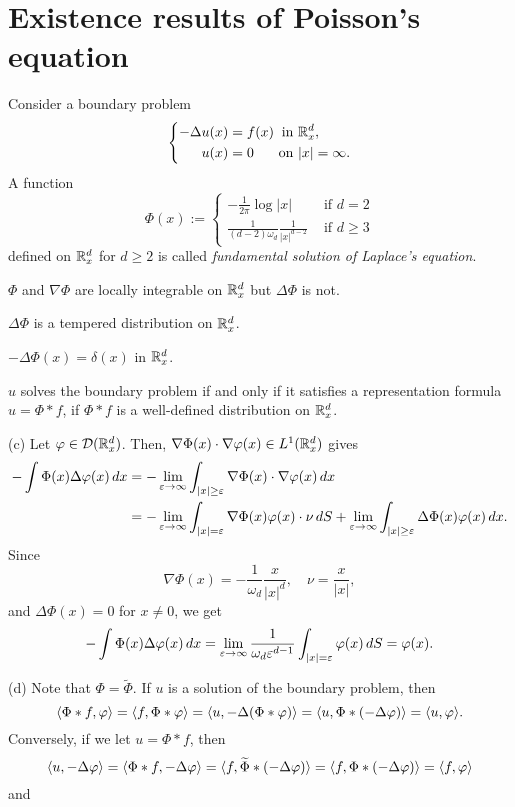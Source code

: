 \documentclass{../note}
\begin{document}
\section{Existence results of Poisson's equation}
\begin{prb}
Consider a boundary problem
\[\left\{\begin{alignedat}{2}
-\Delta u(x)&=f(x) & \text{ in }&\mathbb{R}_x^d,\\
u(x)&=0 & \text{ on }&|x|=\infty.
\end{alignedat}\right.\]
A function
\[\Phi(x):=\begin{cases}-\frac1{2\pi}\log|x|&\text{ if }d=2\\\frac1{(d-2)\omega_d}\frac1{|x|^{d-2}}&\text{ if }d\ge3\end{cases}\]
defined on $\mathbb{R}_x^d$ for $d\ge2$ is called \emph{fundamental solution of Laplace's equation}.
\begin{parts}
\item $\Phi$ and $\nabla\Phi$ are locally integrable on $\mathbb{R}_x^d$ but $\Delta\Phi$ is not.
\item $\Delta\Phi$ is a tempered distribution on $\mathbb{R}_x^d$.
\item $-\Delta\Phi(x)=\delta(x)$ in $\mathbb{R}_x^d$.
\item $u$ solves the boundary problem if and only if it satisfies a representation formula $u=\Phi*f$, if $\Phi*f$ is a well-defined distribution on $\mathbb{R}_x^d$.
\end{parts}
\end{prb}
\begin{pf}
(c)
Let $\varphi\in\mathcal{D}(\mathbb{R}_x^d)$.
Then, $\nabla\Phi(x)\cdot\nabla\varphi(x)\in L^1(\mathbb{R}_x^d)$ gives
\begin{align*}
-\int\Phi(x)\Delta\varphi(x)\,dx
&=-\lim_{\varepsilon\to\infty}\int_{|x|\ge\varepsilon}\nabla\Phi(x)\cdot\nabla\varphi(x)\,dx\\
&=-\lim_{\varepsilon\to\infty}\int_{|x|=\varepsilon}\nabla\Phi(x)\varphi(x)\cdot\nu\,dS
+\lim_{\varepsilon\to\infty}\int_{|x|\ge\varepsilon}\Delta\Phi(x)\varphi(x)\,dx.
\end{align*}
Since
\[\nabla\Phi(x)=-\frac1{\omega_d}\frac x{|x|^d},\quad\nu=\frac x{|x|},\]
and $\Delta\Phi(x)=0$ for $x\ne0$, we get
\[-\int\Phi(x)\Delta\varphi(x)\,dx=\lim_{\varepsilon\to\infty}\frac1{\omega_d\varepsilon^{d-1}}\int_{|x|=\varepsilon}\varphi(x)\,dS=\varphi(x).\]

(d)
Note that $\Phi=\tilde\Phi$.
If $u$ is a solution of the boundary problem, then
\[\langle\Phi*f,\varphi\rangle=\langle f,\Phi*\varphi\rangle=\langle u,-\Delta(\Phi*\varphi)\rangle=\langle u,\Phi*(-\Delta\varphi)\rangle=\langle u,\varphi\rangle.\]
Conversely, if we let $u=\Phi*f$, then
\[\langle u,-\Delta\varphi\rangle=\langle\Phi*f,-\Delta\varphi\rangle=\langle f,\widetilde\Phi*(-\Delta\varphi)\rangle=\langle f,\Phi*(-\Delta\varphi)\rangle=\langle f,\varphi\rangle\]
and
\end{pf}
\end{document}
